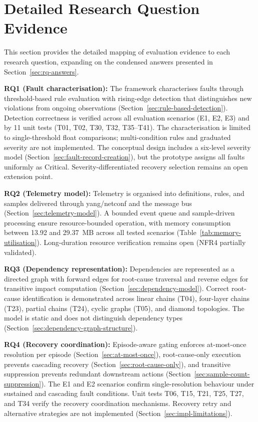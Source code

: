 \section{Detailed Research Question Evidence}\label{sec:appendix-rq-evidence}

This section provides the detailed mapping of evaluation evidence to each research question, expanding on the condensed answers presented in Section~\ref{sec:rq-answers}.

\textbf{RQ1 (Fault characterisation):} The framework characterises faults through threshold-based rule evaluation with rising-edge detection that distinguishes new violations from ongoing observations (Section~\ref{sec:rule-based-detection}). Detection correctness is verified across all evaluation scenarios (E1, E2, E3) and by 11 unit tests (T01, T02, T30, T32, T35--T41). The characterisation is limited to single-threshold float comparisons; multi-condition rules and graduated severity are not implemented. The conceptual design includes a six-level severity model (Section~\ref{sec:fault-record-creation}), but the prototype assigns all faults uniformly as Critical. Severity-differentiated recovery selection remains an open extension point.

\textbf{RQ2 (Telemetry model):} Telemetry is organised into definitions, rules, and samples delivered through \gls{yang}/\gls{netconf} and the message bus (Section~\ref{sec:telemetry-model}). A bounded event queue and sample-driven processing ensure resource-bounded operation, with memory consumption between 13.92 and 29.37~MB across all tested scenarios (Table~\ref{tab:memory-utilisation}). Long-duration resource verification remains open (NFR4 partially validated).

\textbf{RQ3 (Dependency representation):} Dependencies are represented as a directed graph with forward edges for root-cause traversal and reverse edges for transitive impact computation (Section~\ref{sec:dependency-model}). Correct root-cause identification is demonstrated across linear chains (T04), four-layer chains (T23), partial chains (T24), cyclic graphs (T05), and diamond topologies. The model is static and does not distinguish dependency types (Section~\ref{sec:dependency-graph-structure}).

\textbf{RQ4 (Recovery coordination):} Episode-aware gating enforces at-most-once resolution per episode (Section~\ref{sec:at-most-once}), root-cause-only execution prevents cascading recovery (Section~\ref{sec:root-cause-only}), and transitive suppression prevents redundant downstream actions (Section~\ref{sec:sample-count-suppression}). The E1 and E2 scenarios confirm single-resolution behaviour under sustained and cascading fault conditions. Unit tests T06, T15, T21, T25, T27, and T34 verify the recovery coordination mechanisms. Recovery retry and alternative strategies are not implemented (Section~\ref{sec:impl-limitations}).

